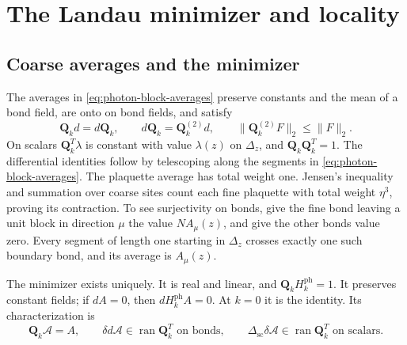 \section{The Landau minimizer and locality}\label{sec:photon-primitives}
\subsection{Coarse averages and the minimizer}\label{subsec:photon-Landau-minimizer}
The averages in \eqref{eq:photon-block-averages} preserve
constants and the mean of a bond field, are onto on bond fields, and
satisfy
\begin{equation}\label{eq:photon-averaging-identities}
 \mathbf Q_kd=d\mathbf Q_k,\qquad
 d\mathbf Q_k=\mathbf Q_k^{(2)}d,\qquad
 \|\mathbf Q_k^{(2)}F\|_2\le\|F\|_2.
\end{equation}
On scalars $\mathbf Q_k^T\lambda$ is constant with value $\lambda(z)$
on $\Delta_z$, and $\mathbf Q_k\mathbf Q_k^T=1$.
The differential identities follow by telescoping along the segments
in \eqref{eq:photon-block-averages}. The plaquette average has total
weight one. Jensen's inequality and summation over coarse sites count
each fine plaquette with total weight $\eta^3$, proving its contraction.
To see surjectivity on bonds, give the fine bond leaving a unit block
in direction $\mu$ the value $N A_\mu(z)$, and give the other bonds
value zero. Every segment of length one starting in $\Delta_z$ crosses
exactly one such boundary bond, and its average is $A_\mu(z)$.

\begin{proposition}\label{prop:photon-Landau-minimizer}
The minimizer exists uniquely. It is real and linear, and
$\mathbf Q_kH_k^{\mathrm{ph}}=1$. It preserves constant fields;
if $dA=0$, then $dH_k^{\mathrm{ph}}A=0$. At $k=0$ it is the identity.
Its characterization is
\begin{equation}\label{eq:photon-minimizer-Euler}
 \mathbf Q_k\mathscr A=A,\qquad
 \delta d\mathscr A\in\operatorname{ran}\mathbf Q_k^T
     \text{ on bonds},\qquad
 \Delta_{\mathrm{sc}}\delta\mathscr A
      \in\operatorname{ran}\mathbf Q_k^T\text{ on scalars}.
\end{equation}
\end{proposition}

